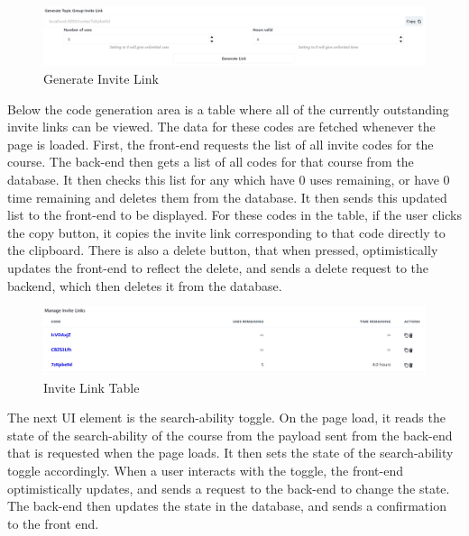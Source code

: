 \begin{figure}[h!]
    \centering
    \includegraphics[scale=0.2]{images/accounts-staff-link.jpg}
    \caption{Generate Invite Link}
\end{figure}

Below the code generation area is a table where all of the currently outstanding invite links can be viewed. The data for these codes are fetched whenever the page is loaded. First, the front-end requests the list of all invite codes for the course. The back-end then gets a list of all codes for that course from the database. It then checks this list for any which have 0 uses remaining, or have 0 time remaining and deletes them from the database. It then sends this updated list to the front-end to be displayed. For these codes in the table, if the user clicks the copy button, it copies the invite link corresponding to that code directly to the clipboard. There is also a delete button, that when pressed, optimistically updates the front-end to reflect the delete, and sends a delete request to the backend, which then deletes it from the database.

\begin{figure}[h!]
    \centering
    \includegraphics[scale=0.2]{images/accounts-staff-table.jpg}
    \caption{Invite Link Table}
\end{figure}

The next UI element is the search-ability toggle. On the page load, it reads the state of the search-ability of the course from the payload sent from the back-end that is requested when the page loads. It then sets the state of the search-ability toggle accordingly. When a user interacts with the toggle, the front-end optimistically updates, and sends a request to the back-end to change the state. The back-end then updates the state in the database, and sends a confirmation to the front end. 

